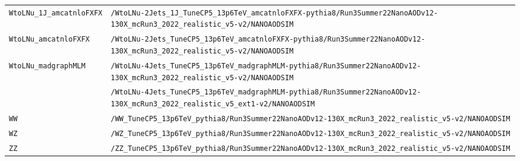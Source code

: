 \begin{longtable}{@{}>{\RaggedRight\arraybackslash}p{} >{\RaggedRight\arraybackslash}p{}@{}}
\addlinespace[2pt]
\texttt{WtoLNu\_\allowbreak{}1J\_\allowbreak{}amcatnloFXFX} & \texttt{/\allowbreak{}WtoLNu-\allowbreak{}2Jets\_\allowbreak{}1J\_\allowbreak{}TuneCP5\_\allowbreak{}13p6TeV\_\allowbreak{}amcatnloFXFX-\allowbreak{}pythia8/\allowbreak{}Run3Summer22NanoAODv12-\allowbreak{}130X\_\allowbreak{}mcRun3\_\allowbreak{}2022\_\allowbreak{}realistic\_\allowbreak{}v5-\allowbreak{}v2/\allowbreak{}NANOAODSIM} \\
\addlinespace[2pt]
\texttt{WtoLNu\_\allowbreak{}amcatnloFXFX} & \texttt{/\allowbreak{}WtoLNu-\allowbreak{}2Jets\_\allowbreak{}TuneCP5\_\allowbreak{}13p6TeV\_\allowbreak{}amcatnloFXFX-\allowbreak{}pythia8/\allowbreak{}Run3Summer22NanoAODv12-\allowbreak{}130X\_\allowbreak{}mcRun3\_\allowbreak{}2022\_\allowbreak{}realistic\_\allowbreak{}v5-\allowbreak{}v2/\allowbreak{}NANOAODSIM} \\
\addlinespace[2pt]
\texttt{WtoLNu\_\allowbreak{}madgraphMLM} & \texttt{/\allowbreak{}WtoLNu-\allowbreak{}4Jets\_\allowbreak{}TuneCP5\_\allowbreak{}13p6TeV\_\allowbreak{}madgraphMLM-\allowbreak{}pythia8/\allowbreak{}Run3Summer22NanoAODv12-\allowbreak{}130X\_\allowbreak{}mcRun3\_\allowbreak{}2022\_\allowbreak{}realistic\_\allowbreak{}v5-\allowbreak{}v2/\allowbreak{}NANOAODSIM} \\
 & \texttt{/\allowbreak{}WtoLNu-\allowbreak{}4Jets\_\allowbreak{}TuneCP5\_\allowbreak{}13p6TeV\_\allowbreak{}madgraphMLM-\allowbreak{}pythia8/\allowbreak{}Run3Summer22NanoAODv12-\allowbreak{}130X\_\allowbreak{}mcRun3\_\allowbreak{}2022\_\allowbreak{}realistic\_\allowbreak{}v5\_\allowbreak{}ext1-\allowbreak{}v2/\allowbreak{}NANOAODSIM} \\
\addlinespace[2pt]
\texttt{WW} & \texttt{/\allowbreak{}WW\_\allowbreak{}TuneCP5\_\allowbreak{}13p6TeV\_\allowbreak{}pythia8/\allowbreak{}Run3Summer22NanoAODv12-\allowbreak{}130X\_\allowbreak{}mcRun3\_\allowbreak{}2022\_\allowbreak{}realistic\_\allowbreak{}v5-\allowbreak{}v2/\allowbreak{}NANOAODSIM} \\
\addlinespace[2pt]
\texttt{WZ} & \texttt{/\allowbreak{}WZ\_\allowbreak{}TuneCP5\_\allowbreak{}13p6TeV\_\allowbreak{}pythia8/\allowbreak{}Run3Summer22NanoAODv12-\allowbreak{}130X\_\allowbreak{}mcRun3\_\allowbreak{}2022\_\allowbreak{}realistic\_\allowbreak{}v5-\allowbreak{}v2/\allowbreak{}NANOAODSIM} \\
\addlinespace[2pt]
\texttt{ZZ} & \texttt{/\allowbreak{}ZZ\_\allowbreak{}TuneCP5\_\allowbreak{}13p6TeV\_\allowbreak{}pythia8/\allowbreak{}Run3Summer22NanoAODv12-\allowbreak{}130X\_\allowbreak{}mcRun3\_\allowbreak{}2022\_\allowbreak{}realistic\_\allowbreak{}v5-\allowbreak{}v2/\allowbreak{}NANOAODSIM} \\

\end{longtable}
